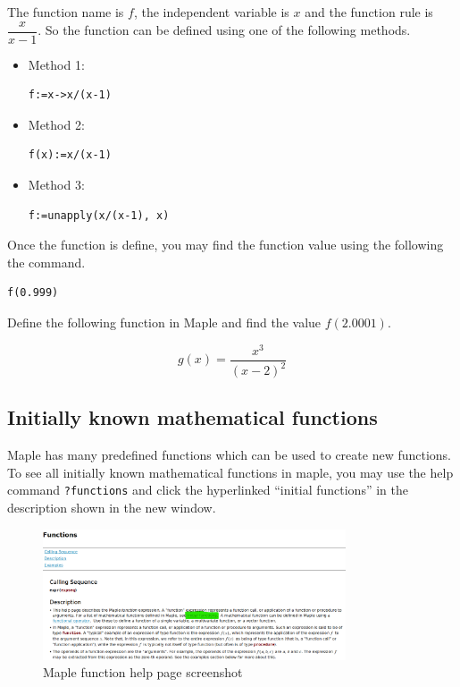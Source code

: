 \documentclass[
  12pt]{elegantbook}
\begin{document}
\begin{solution}

The function name is \(f\), the independent variable is \(x\) and the function rule is \(\dfrac{x}{x-1}\). So the function can be defined using one of the following methods.

\begin{itemize}
\item
  Method 1:

\begin{verbatim}
f:=x->x/(x-1)
\end{verbatim}
\item
  Method 2:

\begin{verbatim}
f(x):=x/(x-1)
\end{verbatim}
\item
  Method 3:

\begin{verbatim}
f:=unapply(x/(x-1), x)
\end{verbatim}
\end{itemize}

Once the function is define, you may find the function value using the following the command.

\begin{verbatim}
f(0.999)
\end{verbatim}

\end{solution}

\begin{exercise}
Define the following function in Maple and find the value \(f(2.0001)\).

\[g(x)=\dfrac{x^3}{(x-2)^2}\]
\end{exercise}

\hypertarget{initially-known-mathematical-functions}{%
\subsection{Initially known mathematical functions}\label{initially-known-mathematical-functions}}

Maple has many predefined functions which can be used to create new functions. To see all initially known mathematical functions in maple, you may use the help command \texttt{?functions} and click the hyperlinked ``initial functions'' in the description shown in the new window.

\begin{figure}
\centering
\includegraphics[width=0.8\textwidth,height=\textheight]{figs/Initial-Functions.PNG}
\caption{Maple function help page screenshot}
\end{figure}
\end{document}

